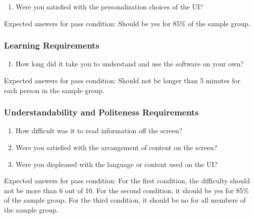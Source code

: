\documentclass[12pt, titlepage]{article}
\begin{document}
\begin{enumerate}
\item{Were you satisfied with the personalization choices of the UI?\\}

\end{enumerate}

\noindent Expected answers for pass condition: Should be yes for 85\% of the sample group. 


\subsubsection{Learning Requirements}

\begin{enumerate}
\item{How long did it take you to understand and use the software on your own?\\}

\end{enumerate}

\noindent Expected answers for pass condition: Should not be longer than 5 minutes for each person in the sample group. 


\subsubsection{Understandability and Politeness Requirements}

\begin{enumerate}
\item{How difficult was it to read information off the screen?\\}
\item{Were you satisfied with the arrangement of content on the screen?\\}
\item{Were you displeased with the language or content used on the UI?\\}

\end{enumerate}

\noindent Expected answers for pass condition: For the first condition, the difficulty should not be more than 6 out of 10. For the second condition, it should be yes for 85\% of the sample group. For the third condition, it should be no for all members of the sample group.
\end{document}
